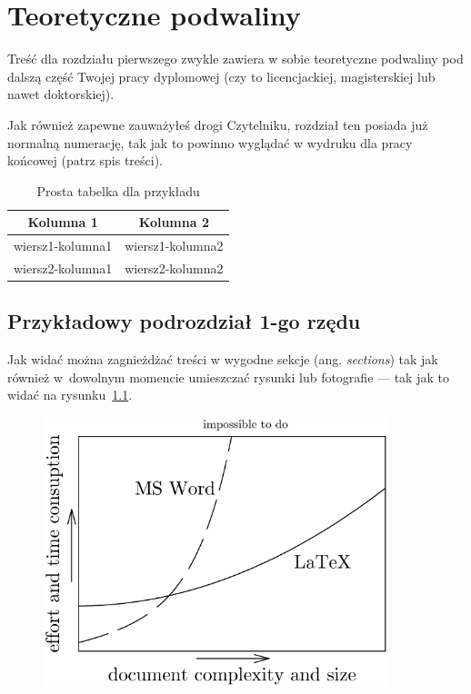 \chapter{Teoretyczne podwaliny}
\label{chap:teoretyczne_podwaliny}

Treść dla rozdziału pierwszego zwykle zawiera w sobie teoretyczne podwaliny pod dalszą część Twojej pracy dyplomowej (czy to licencjackiej, magisterskiej lub nawet doktorskiej). 

Jak również zapewne zauważyłeś drogi Czytelniku, rozdział ten posiada już normalną numerację, tak jak to powinno wyglądać w wydruku dla pracy końcowej (patrz spis treści).

\begin{table}[!h]
    \centering
    \begin{tabular}{|c|c|}
    \hline
    \textbf{Kolumna 1} & \textbf{Kolumna 2} \\ \hline \hline
    wiersz1-kolumna1 & wiersz1-kolumna2 \\ \hline
    wiersz2-kolumna1 & wiersz2-kolumna2 \\ \hline
    \end{tabular}
\caption{Prosta tabelka dla przykładu}
\label{tab:tab:prosta-tabela-przyklad-A}
\end{table}


\section{Przykładowy podrozdział 1-go rzędu}
Jak widać można zagnieżdżać treści w wygodne sekcje (ang. \textit{sections}) tak jak również w~dowolnym momencie umieszczać rysunki lub fotografie --- tak jak to widać na rysunku~\ref{fig:word-vs-latex}.

\begin{figure}[!ht]
\centering
\includegraphics[width=100mm]{images/word-vs-latex.png}
\label{fig:word-vs-latex}
\end{figure}

